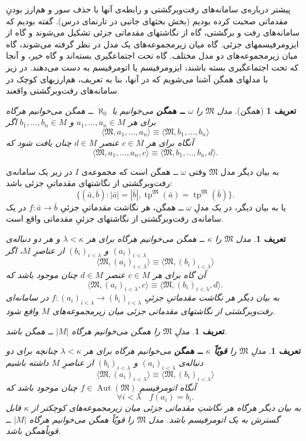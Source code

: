 \documentclass[12pt,a4paper]{article}
\theoremstyle{colorhead}
\newtheorem{defn}[thm]{تعریف}
\DeclareMathOperator{\tp}{tp}
\DeclareMathOperator{\Aut}{Aut}
\begin{document}
  پیشتر درباره‌ی سامانه‌های رفت‌وبرگشتی و رابطه‌ی آنها با حذف سور و 
  هم‌ارز بودنِ مقدماتی صحبت کرده‌ بودیم (بخش بحثهای جانبی در تارنمای درس).
  گفته بودیم که سامانه‌های رفت و برگشتی، گاه
  از نگاشتهای مقدماتی جزئی تشکیل می‌شوند و گاه از ایزومرفیسمهای جزئی. گاه میان زیرمجموعه‌های یک مدل در نظر گرفته می‌شوند، گاه میان زیرمجموعه‌های دو مدل مختلف. گاه تحت اجتماعگیری بسته‌اند و گاه خیر،‌ و آنجا که تحت اجتماعگیری بسته باشند، ایزومرفیسم یا اتومرفیسم به دست می‌دهند. در زیر با مدلهای همگن آشنا می‌شویم که در‌ آنها، بنا به تعریف، هم‌ارزیهای کوچک در سامانه‌های رفت‌وبرگشتی واقعند. 
\begin{defn}[همگن]
مدل
$\mathfrak{M}$
را 
\textbf{$\omega$
ــ
همگن
}
می‌خوانیم یا
$\aleph_0$
ــ
همگن می‌خوانیم هرگاه برای هر
$a_1,\ldots, a_n\in M$
و 
$b_1,\ldots,b_n\in M$
اگر
\[
\langle \mathfrak{M},a_1,\ldots,a_n\rangle \equiv \langle \mathfrak{M},b_1,\ldots,b_n\rangle
\]
آنگاه برای هر
$c\in M$
عنصر
$d\in M$
چنان یافت شود که
\[
\langle\mathfrak{M},a_1,\ldots,a_n,c\rangle \equiv \langle \mathfrak{M},b_1,\ldots,b_n, d\rangle.
\]
\end{defn}
به بیان دیگر مدل
$\mathfrak{M}$
وقتی
$\omega$
ــ
همگن است که مجموعه‌ی
$I$
در زیر یک سامانه‌ی رفت‌وبرگشتی از نگاشتهای مقدماتیِ جزئی باشد:
\[
\{(\bar{a},\bar{b}):|\bar{a}|=|\bar{b}|,  \tp^\mathfrak{M}(\bar{a})= \tp^\mathfrak{M}(\bar{b})\}.
\]
یا به بیان دیگر، در یک مدلِ
$\omega$
ــ
همگن، هر نگاشت مقدماتیِ جزئیِ
$f:\bar{a}\to \bar{b}$
در یک سامانه‌ی رفت‌وبرگشتی از نگاشتهای جزئیِ مقدماتی واقع است.
\begin{defn}
مدل
$\mathfrak{M}$
را
$\kappa$
ــ
همگن می‌خوانیم هرگاه برای هر
$\lambda<\kappa$
و هر
دو دنباله‌ی
$(a_i)_{i<\lambda}$
و
$(b_i)_{i<\lambda}$
از عناصرِ
$M$،
اگر
\[
\langle \mathfrak{M},(a_i)_{i<\lambda}\rangle \equiv \langle \mathfrak{M},(b_i)_{i<\lambda}\rangle
\]
آن گاه برای هر
$c\in M$
عنصر
$d\in M$
چنان موجود باشد که 
\[
\langle \mathfrak{M},(a_i)_{i<\lambda},c\rangle \equiv \langle \mathfrak{M},(b_i)_{i<\lambda},d\rangle.
\]
به بیان دیگر هر نگاشت مقدماتیِ
جزئیِ
$f:(a_i)_{i<\lambda}\to (b_i)_{i<\lambda}$
در سامانه‌ای رفت‌وبرگشتی از نگاشتهای مقدماتی جزئی میان زیرمجموعه‌های
$M$
واقع شود.
\end{defn}
\begin{defn}
مدلِ
$\mathfrak{M}$
را همگن می‌خوانیم هرگاه
$|M|$
ــ
همگن باشد.
\end{defn}
\begin{defn}
مدلِ
$\mathfrak{M}$
را
\textbf{ قویّاً 
$\kappa$
ــ
همگن }
می‌خوانیم هرگاه برای هر
$\lambda<\kappa$
چنانچه برای دو دنباله‌ی
$(a_i)_{i<\lambda}$
و
$(b_i)_{i<\lambda}$
از عناصرِ
$M$
داشته باشیم
\[
\langle \mathfrak{M},(a_i)_{i<\lambda}\rangle \equiv 
\langle \mathfrak{M},(b_i)_{i<\lambda}\rangle 
\]
آنگاه اتومرفیسمِ
$f\in \Aut(\mathfrak{M})$
چنان موجود باشد که
\[
\forall i<\lambda \quad f(a_i)=b_i.
\]
به بیان دیگر هرگاه هر نگاشتِ 
مقدماتی جزئی میان زیرمجموعه‌های کوچکتر از
$\kappa$
قابل گسترش به یک اتومرفیسم باشد. مدل
$\mathfrak{M}$
را قویّاً همگن می‌خوانیم هرگاه
$|M|$
ــ
قویاً‌همگن باشد.
\end{defn}
\end{document}
